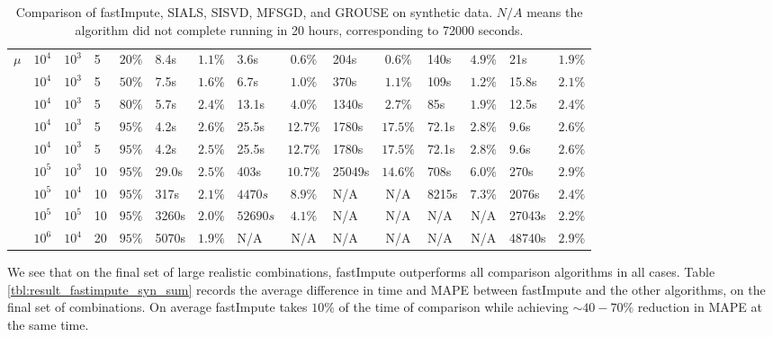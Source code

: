\documentclass[twoside,11pt]{article}
\begin{document}
\begin{table}[t]
{\begin{tabular}{|c|l|l|l|l||l|c|l|c|l|c|l|c||l|c|}
\multirow{4}{*}{$\mu$} &	$10^4$ & $10^3$ & 5 & $20\%$ & 8.4s &$1.1\%$ & 3.6s & $0.6\%$& 204s & $0.6\%$& 140s & $4.9\%$& 21s & $1.9\%$ \\
	&$10^4$ & $10^3$ & 5 & $50\%$ & 7.5s &$1.6\%$ &6.7s & $1.0\%$ &370s & $1.1\%$ &109s & $1.2\%$&15.8s & $2.1\%$\\
	&$10^4$ & $10^3$ & 5 & $80\%$ & 5.7s&$2.4\%$ &13.1s & $4.0\%$&1340s & $2.7\%$ &85s & $1.9\%$&12.5s & $2.4\%$\\
	&$10^4$ & $10^3$& 5 & $95\%$ & 4.2s&$2.6\%$ & 25.5s&$12.7\%$ &1780s & $17.5\%$ & 72.1s & $2.8\%$& 9.6s & $2.6\%$\\\hline\hline
	&$10^4$ & $10^3$& 5 & $95\%$ & 4.2s&$2.5\%$ & 25.5s&$12.7\%$ &1780s & $17.5\%$ & 72.1s & $2.8\%$& 9.6s & $2.6\%$\\
	&$10^5$ & $10^3$& 10 & $95\%$ & 29.0s &$2.5\%$ & 403s & $10.7\%$& 25049s  & $14.6\%$ & 708s & $6.0\%$& 270s & $2.9\%$\\
	&$10^5$ & $10^4$& 10 & $95\%$ & 317s &$2.1\%$ &$4470s$ &$8.9\%$&N/A & N/A &8215s& $7.3\%$&2076s& $2.4\%$\\
	&$10^5$ & $10^5$& 10 & $95\%$ & 3260s &$2.0\%$ &$52690s$ & $4.1\%$ &N/A & N/A  &N/A & N/A&27043s& $2.2\%$ \\
	&$10^6$ & $10^4$& 20 & $95\%$ & 5070s &$1.9\%$ & N/A & N/A & N/A & N/A & N/A & N/A&48740s& $2.9\%$ \\\hline\hline
\end{tabular}
}
\caption{Comparison of fastImpute,  SIALS, SISVD, MFSGD, and GROUSE on synthetic data.  $N/A$ means the algorithm did not complete running in 20 hours, corresponding to 72000 seconds. }
\label{tbl:result_fastimpute_syn}
\end{table}

We see that on the final set of large realistic combinations, fastImpute outperforms all comparison algorithms in all cases. Table \ref{tbl:result_fastimpute_syn_sum} records the average difference in time and MAPE between fastImpute and the other algorithms, on the final set of combinations. On average fastImpute takes $10\%$ of the time of comparison while achieving  $\sim 40-70\%$ reduction in MAPE at the same time. 
\end{document}

